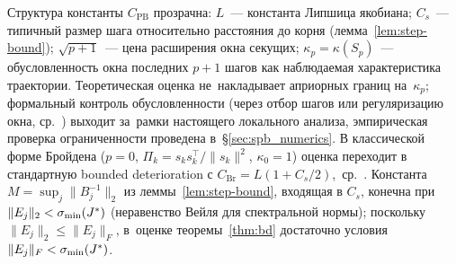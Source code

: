 \begin{remark}\label{rem:csp-meaning}
Структура константы $C_{\mathrm{PB}}$ прозрачна: $L$~--- константа Липшица
якобиана; $C_s$~--- типичный размер шага относительно расстояния до
корня (лемма~\ref{lem:step-bound}); $\sqrt{p+1}$~--- цена расширения окна
секущих; $\kappa_p = \kappa(S_p)$~--- обусловленность окна последних
$p+1$ шагов как наблюдаемая характеристика траектории. Теоретическая
оценка не~накладывает априорных границ на~$\kappa_p$; формальный контроль
обусловленности (через отбор шагов или регуляризацию окна,
ср.~\cite{burdakov2018}) выходит за~рамки настоящего локального анализа,
эмпирическая проверка ограниченности проведена в~\S\ref{sec:spb_numerics}.
В классической форме Бройдена ($p=0$, $\Pi_k = s_k s_k^\top/\|s_k\|^2$,
$\kappa_0 = 1$) оценка переходит в стандартную bounded deterioration
с $C_{\mathrm{Br}} = L(1+C_s/2)$,~ср.~\cite{broyden1973,dennis1996}.
Константа $M = \sup_j\|B_j^{-1}\|_2$ из леммы~\ref{lem:step-bound},
входящая в $C_s$, конечна при $\|E_j\|_2<\sigma_{\min}(J^{*})$
(неравенство Вейля для спектральной нормы); поскольку
$\|E_j\|_2\le\|E_j\|_F$, в~оценке теоремы~\ref{thm:bd} достаточно
условия $\|E_j\|_F<\sigma_{\min}(J^{*})$.
\end{remark}


